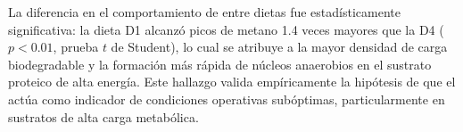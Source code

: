 La diferencia en el comportamiento de  entre dietas fue
estadísticamente significativa: la dieta D1 alcanzó picos de
metano 1.4 veces mayores que la D4 ($p < 0.01$, prueba $t$ de Student),
lo cual se atribuye a la mayor densidad de carga biodegradable y la
formación más rápida de núcleos anaerobios en el sustrato proteico
de alta energía. Este hallazgo valida empíricamente la hipótesis de
que el  actúa como indicador de condiciones operativas
subóptimas, particularmente en sustratos de alta carga metabólica.

